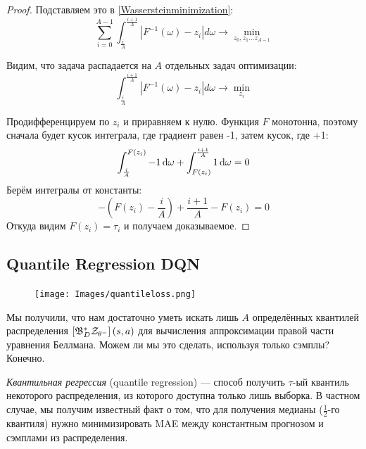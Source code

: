 \begin{theorem}
\begin{proof}
Подставляем это в \eqref{Wassersteinminimization}:
\begin{equation*}
\sum_{i = 0}^{A - 1} \int_{\frac{i}{A}}^{\frac{i + 1}{A}} \left| F^{-1}(\omega) - z_i \right| d\omega \to \min_{z_0, z_1 \dots z_{A-1}}
\end{equation*}

Видим, что задача распадается на $A$ отдельных задач оптимизации:
\begin{equation}\label{w1minim}
\int_{\frac{i}{A}}^{\frac{i + 1}{A}} \left| F^{-1}(\omega) - z_i \right| d\omega \to \min_{z_i}
\end{equation}

Продифференцируем по $z_i$ и приравняем к нулю. Функция $F$ монотонна, поэтому сначала будет кусок интеграла, где градиент равен -1, затем кусок, где +1:
\begin{equation*}
\int_{\frac{i}{A}}^{F(z_i)} -1 \mathop{}\!\mathrm{d} \omega + \int_{F(z_i)}^{\frac{i+1}{A}} 1 \mathop{}\!\mathrm{d} \omega = 0
\end{equation*}
Берём интегралы от константы:
\begin{equation*}
-\left( F(z_i) - \frac{i}{A} \right) + \frac{i+1}{A} - F(z_i) = 0
\end{equation*}
Откуда видим $F(z_i) = \tau_i$ и получаем доказываемое.
\end{proof}
\end{theorem}

\subsection{Quantile Regression DQN}\label{subsec:qrdqn}

\begin{figure}
\vspace{-0.5cm}
\centering
\texttt{[image: Images/quantileloss.png]}
\vspace{-1.2cm}
\end{figure}

Мы получили, что нам достаточно уметь искать лишь $A$ определённых квантилей распределения $\left[ \mathfrak{B}^*_D \mathcal{Z}_{\theta^-} \right](s, a)$ для вычисления аппроксимации правой части уравнения Беллмана. Можем ли мы это сделать, используя только сэмплы? Конечно. 

\emph{Квантильная регрессия} (quantile regression) --- способ получить $\tau$-ый квантиль некоторого распределения, из которого доступна только лишь выборка. В частном случае, мы получим известный факт о том, что для получения медианы ($\frac{1}{2}$-го квантиля) нужно минимизировать MAE между константным прогнозом и сэмплами из распределения.


